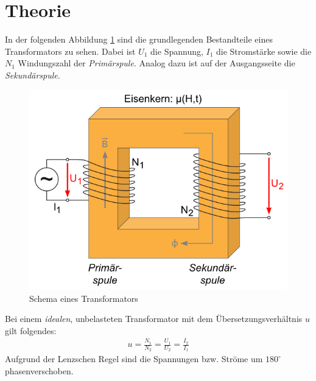 \documentclass[12pt,a4paper,titlepage,headinclude,bibtotoc]{scrartcl}
\begin{document}
\section{Theorie}
\label{sec:theorie}
In der folgenden Abbildung \ref{fig:TrafoSchema} sind die grundlegenden Bestandteile eines Transformators zu sehen.
Dabei ist $U_1$ die Spannung, $I_1$ die Stromstärke sowie die $N_1$ Windungszahl der \textit{Primärspule}.
Analog dazu ist auf der Ausgangsseite die \textit{Sekundärspule}.

\begin{figure}[!htb]
	\centering
	\includegraphics[scale=1.0]{TrafoSchema.png}
	\caption{Schema eines Transformators \protect\footnotemark}
	\label{fig:TrafoSchema}
\end{figure}

Bei einem \textit{idealen}, unbelasteten Transformator mit dem Übersetzungsverhältnis $u$ gilt folgendes:
\begin{align}
	u=\frac{N_1}{N_2}=\frac{U_1}{U_2}=\frac{I_2}{I_1}  
\end{align}
Aufgrund der Lenzschen Regel sind die Spannungen bzw. Ströme um $180^\circ$ phasenverschoben.
\end{document}
